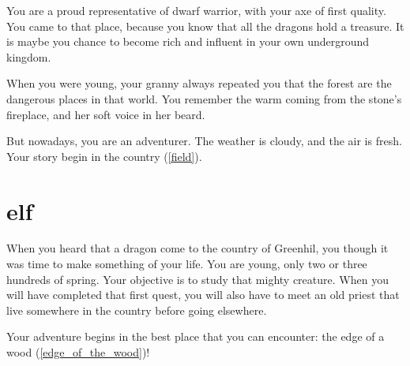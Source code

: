 You are a proud representative of dwarf warrior, with your axe of first
quality. You came to that place, because you know that all the dragons hold a
treasure. It is maybe you chance to become rich and influent in your own
underground kingdom.

When you were young, your granny always repeated you that the forest are the
dangerous places in that world. You remember the warm coming from the stone's
fireplace, and her soft voice in her beard.

But nowadays, you are an adventurer. The weather is cloudy, and the air is
fresh. Your story begin in the country (\ref{field}).

\section{elf}

When you heard that a dragon come to the country of Greenhil, you though it was
time to make something of your life. You are young, only two or three hundreds
of spring. Your objective is to study that mighty creature. When you will have
completed that first quest, you will also have to meet an old priest that live
somewhere in the country before going elsewhere.

Your adventure begins in the best place that you can encounter: the edge of a
wood (\ref{edge_of_the_wood})!
